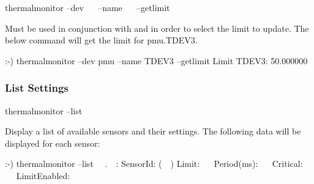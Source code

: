 \begin{CommandLine}
thermalmonitor --dev ~~ --name ~~ --getlimit
\end{CommandLine}

Must be used in conjunction with  and  in order to select the limit
to update. The below command will get the limit for pmu.TDEV3.

\begin{LogExcerpt}
:-) thermalmonitor --dev pmu --name TDEV3 --getlimit
Limit TDEV3: 50.000000
\end{LogExcerpt}

\newpage
\subsubsection{List Settings}

\begin{CommandLine}
thermalmonitor --list
\end{CommandLine}

Display a list of available sensors and their settings. The following data will be displayed for each sensor:

\begin{LogExcerpt}
:-) thermalmonitor --list
~~.~~:
	SensorId: (~~)
	Limit: ~~
	Period(ms): ~~
	Critical: ~~
	LimitEnabled: ~~
\end{LogExcerpt}

